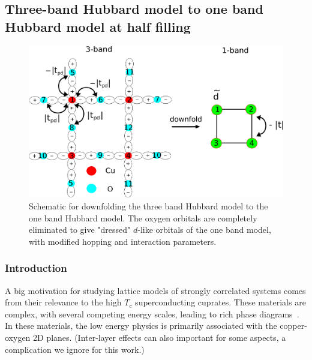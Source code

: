 \documentclass[prl,12pt,onecolumn,nofootinbib,notitlepage,english,superscriptaddress]{revtex4-1}
\newcommand{\HJC}[1]{{\color{RED}{\bf HJC: #1}}}
\begin{document}
\subsection{Three-band Hubbard model to one band Hubbard model at half filling}
\begin{figure}[htpb]
\centering
\includegraphics[width=1\linewidth]{./three_band_figure.pdf}
\caption{Schematic for downfolding the three band Hubbard model to the one band Hubbard model. 
The oxygen orbitals are completely eliminated to give "dressed" $d$-like orbitals of the one band model, with modified hopping 
and interaction parameters.}
\label{fig:hamfit} 
\end{figure}	

\subsubsection{Introduction}
A big motivation for studying lattice models of strongly correlated systems comes from their 
relevance to the high $T_c$ superconducting cuprates. These materials are complex, with several 
competing energy scales, leading to rich phase diagrams~\cite{Dagotto_RevModPhys, LeeWen_RevModPhys}. In these materials, 
the low energy physics is primarily associated with the copper-oxygen 2D planes. 
(Inter-layer effects can also important for some aspects, a complication we ignore 
for this work.) 
\end{document}
